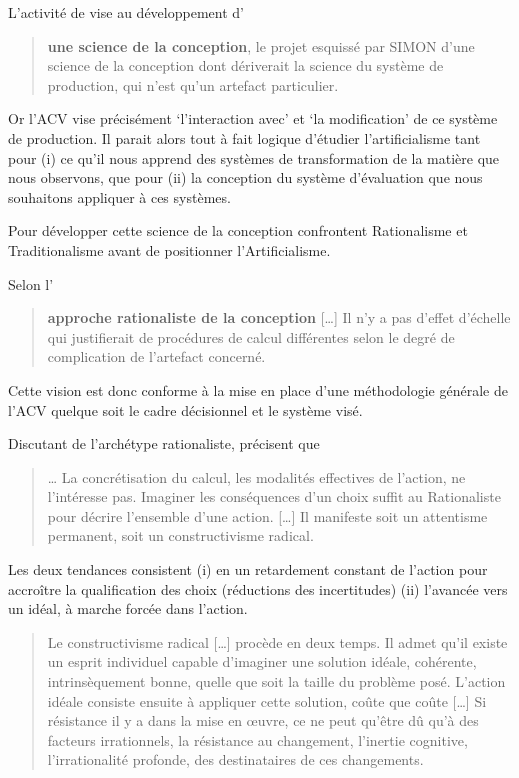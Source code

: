L'activité de \citeauthor{micaelli_artificialisme:_2003} vise au développement d'
\blockcquote[p.8-9]{micaelli_artificialisme:_2003}{
\textbf{une science de la conception},
le projet esquissé par SIMON d'une science de la conception dont dériverait la science du système de production, qui n'est qu'un artefact particulier.
}
Or l'ACV vise précisément `l'interaction avec' et `la modification' de ce système de production.
Il parait alors tout à fait logique d'étudier l'artificialisme tant pour (i) ce qu'il nous apprend des systèmes de transformation de la matière que nous observons, que pour (ii) la conception du système d'évaluation que nous souhaitons appliquer à ces systèmes.


Pour développer cette science de la conception \citeauthor{micaelli_artificialisme:_2003} confrontent Rationalisme et Traditionalisme avant de positionner l'Artificialisme.

Selon l'
\blockcquote[p.25]{micaelli_artificialisme:_2003}{
\textbf{approche rationaliste de la conception}
[\ldots]
Il n'y a pas d'effet d'échelle qui justifierait de procédures de calcul différentes selon le degré de complication de l'artefact concerné.
}
Cette vision est donc conforme à la mise en place d'une méthodologie générale de l'\gls{ACV} quelque soit le cadre décisionnel et le système visé.

Discutant de l’archétype rationaliste, \citeauthor{micaelli_artificialisme:_2003} précisent que
\blockcquote[2.1.2 p.25]{micaelli_artificialisme:_2003}{
\ldots
La concrétisation du calcul, les modalités effectives de l'action, ne l'intéresse pas.
Imaginer les conséquences d'un choix suffit au Rationaliste pour décrire l'ensemble d'une action.
[\ldots]
Il manifeste soit un attentisme permanent, soit un constructivisme radical.
}
Les deux tendances consistent (i) en un retardement constant de l'action pour accroître la qualification des choix (réductions des incertitudes) (ii) l'avancée vers un idéal, à marche forcée dans l'action.

\blockcquote[p.27]{micaelli_artificialisme:_2003}{
Le constructivisme radical [\ldots] procède en deux temps.
Il admet qu'il existe un esprit individuel capable d'imaginer une solution idéale, cohérente, intrinsèquement bonne, quelle que soit la taille du problème posé.
L'action idéale consiste ensuite à appliquer cette solution, coûte que coûte [\ldots]
Si résistance il y a dans la mise en œuvre, ce ne peut qu'être dû qu'à des facteurs irrationnels, la résistance au changement, l'inertie cognitive, l'irrationalité profonde, des destinataires de ces changements.}

